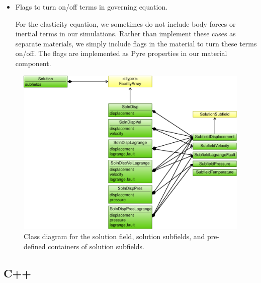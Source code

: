 \begin{itemize}
\item Flags to turn on/off terms in governing equation.

  For the elasticity equation, we sometimes do not include body forces
  or inertial terms in our simulations. Rather than implement these
  cases as separate materials, we simply include flags in the material
  to turn these terms on/off. The flags are implemented as Pyre
  properties in our material component.
\end{itemize}

\begin{figure}[htbp]
  \includegraphics[scale=0.8]{developer/figs/solution_classdiagram}
  \caption{Class diagram for the solution field, solution subfields,
    and pre-defined containers of solution subfields.}
  \label{fig:developer:solution:class}
\end{figure}

\subsection{C++}


